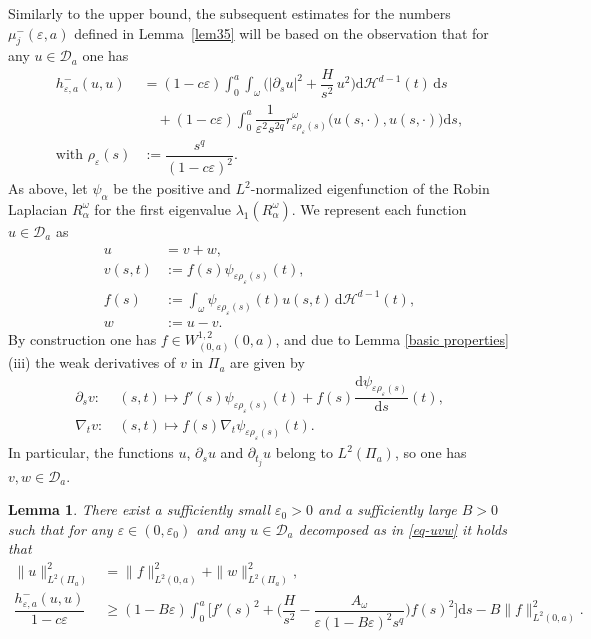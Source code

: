 \documentclass[11pt,oneside,reqno,a4paper]{amsart}
\newcommand{\dd}{\mathrm{d}}
\newcommand{\cD}{\mathcal{D}}
\renewcommand{\H}{\mathcal{H}}
\newcommand{\eps}{\varepsilon}
\newtheorem{lemma}[theorem]{Lemma}
\theoremstyle{definition}
\begin{document}
Similarly to the upper bound, the subsequent estimates for the numbers $\mu^-_j(\eps,a)$
defined in Lemma~\ref{lem35} will be based on the observation that for any $u\in\cD_a$
one has
\begin{equation}
	\label{hplus1b}	
	\begin{aligned}
		h^{-}_{\eps,a}(u,u)&= (1-c\eps)\int_0^a \int_{\omega}\bigg(|\partial_su|^2+\dfrac{H}{s^2}\,u^2\bigg)\dd\H^{d-1}(t)\,\dd s\\
		&\quad
		+(1-c\eps)\int_0^a \dfrac{1}{\eps^2s^{2q}} r^\omega_{\eps\rho_\eps(s)}\big(u(s,\cdot),u(s,\cdot)\big)\dd s,\\
\text{with }	\rho_\eps(s)&:=\dfrac{s^q}{(1-c\eps)^2}.
	\end{aligned}
\end{equation}
As above, let $\psi_\alpha$ be the positive and $L^2$-normalized eigenfunction of the Robin Laplacian $R^\omega_\alpha$ for the first eigenvalue $\lambda_1(R^\omega_\alpha)$.
We represent each function $u\in \cD_a$ as
\begin{align}
	u&=v+w, \label{eq-uvw}\\
	v(s,t)&:=f(s)\psi_{\eps\rho_\eps(s)}(t),\nonumber\\
	f(s)&:=\int_\omega \psi_{\eps\rho_\eps(s)}(t)u(s,t)\,\dd\H^{d-1}(t),\nonumber\\
w&:=u-v. \nonumber
\end{align}
By construction one has $f\in W^{1,2}_{(0,a)}(0,a)$,
and due to Lemma \ref{basic properties}(iii) the weak derivatives of $v$ in $\Pi_a$ are given by
\begin{align}
	\partial_s v:&\ (s,t)\mapsto f'(s)\psi_{\eps \rho_\eps(s)}(t)+f(s)\dfrac{\dd \psi_{\eps\rho_\eps(s)}}{\dd s}(t), \label{psv}\\
	\nabla_t v:&\ (s,t)\mapsto f(s)\nabla_t \psi_{\eps \rho_\eps(s)}(t).\nonumber
\end{align}
In particular, the functions $u$, $\partial_s u$ and $\partial_{t_j} u$ belong to $L^2(\Pi_a)$,
so one has $v,w\in \cD_a$.


\begin{lemma}\label{lem43}
There exist a sufficiently small $\eps_0>0$ and a sufficiently large $B>0$ such that
for any $\eps\in(0,\eps_0)$ and any $u\in \cD_a$ decomposed as in \eqref{eq-uvw} it holds that
\begin{align*}
\|u\|^2_{L^2(\Pi_a)}&=\|f\|^2_{L^2(0,a)}+\|w\|^2_{L^2(\Pi_a)},\\
\dfrac{h^-_{\eps,a}(u,u)}{1-c\eps}&\ge (1-B\eps)\int_0^a\bigg[f'(s)^2  +\bigg(\dfrac{H}{s^2}
-\dfrac{A_\omega}{\eps (1-B\eps)^2 s^q}\bigg)	f(s)^2	\bigg]\dd s
-B\|f\|^2_{L^2(0,a)}.
\end{align*}
\end{lemma}
\end{document}
